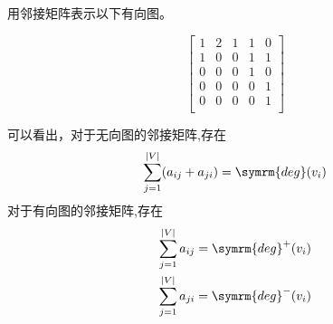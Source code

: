 \begin{collections}
    \begin{example}
        用邻接矩阵表示以下有向图。
        \vspace{-2em}
        \begin{center}
            \vspace{-2em}
        \end{center}
    \end{example}
    \begin{solution}
        $$
        \begin{bmatrix}
            1 & 2 & 1 & 1 & 0 \\
            1 & 0 & 0 & 1 & 1 \\
            0 & 0 & 0 & 1 & 0 \\
            0 & 0 & 0 & 0 & 1 \\
            0 & 0 & 0 & 0 & 1 \\
        \end{bmatrix}
        $$
    \end{solution}
\end{collections}

可以看出，对于无向图的邻接矩阵,存在
\begin{equation*}
    \sum_{j=1}^{|V|}(a_{ij} + a_{ji})=\symrm{deg}(v_i)
\end{equation*}
对于有向图的邻接矩阵,存在
\begin{equation*}
    \begin{aligned}
        \sum_{j=1}^{|V|}a_{ij}=\symrm{deg}^+(v_i) \\
        \sum_{j=1}^{|V|}a_{ji}=\symrm{deg}^-(v_i) \\
    \end{aligned}
\end{equation*}

